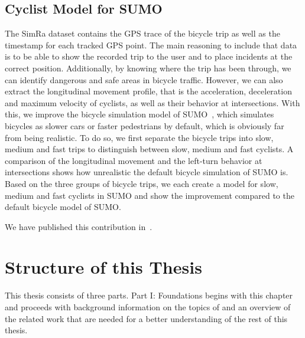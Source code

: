 \subsection{Cyclist Model for SUMO}
\label{subsec:sumo_contribution}
The SimRa dataset contains the GPS trace of the bicycle trip as well as the timestamp for each tracked GPS point.
The main reasoning to include that data is to be able to show the recorded trip to the user and to place incidents at the correct position.
Additionally, by knowing where the trip has been through, we can identify dangerous and safe areas in bicycle traffic.
However, we can also extract the longitudinal movement profile, that is the acceleration, deceleration and maximum velocity of cyclists, as well as their behavior at intersections.
With this, we improve the bicycle simulation model of SUMO~\cite{lopez2018microscopic}, which simulates bicycles as slower cars or faster pedestrians by default, which is obviously far from being realistic.
To do so, we first separate the bicycle trips into slow, medium and fast trips to distinguish between slow, medium and fast cyclists.
A comparison of the longitudinal movement and the left-turn behavior at intersections shows how unrealistic the default bicycle simulation of SUMO is.
Based on the three groups of bicycle trips, we each create a model for slow, medium and fast cyclists in SUMO and show the improvement compared to the default bicycle model of SUMO.

We have published this contribution in~\cite{karakaya2022realistic,karakaya2023achieving}.

\section{Structure of this Thesis}
\label{sec:structure}

This thesis consists of three parts. Part I: Foundations begins with this chapter and proceeds with background information on the topics of  and an overview of the related work that are needed for a better understanding of the rest of this thesis. 
